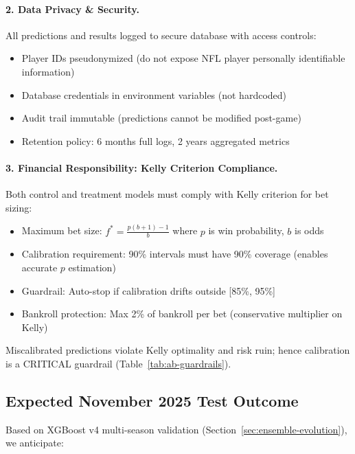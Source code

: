 \paragraph{2. Data Privacy \& Security.}
All predictions and results logged to secure database with access controls:
\begin{itemize}[itemsep=2pt,parsep=0pt]
    \item Player IDs pseudonymized (do not expose NFL player personally identifiable information)
    \item Database credentials in environment variables (not hardcoded)
    \item Audit trail immutable (predictions cannot be modified post-game)
    \item Retention policy: 6 months full logs, 2 years aggregated metrics
\end{itemize}

\paragraph{3. Financial Responsibility: Kelly Criterion Compliance.}
Both control and treatment models must comply with Kelly criterion for bet sizing:
\begin{itemize}[itemsep=2pt,parsep=0pt]
    \item Maximum bet size: $f^* = \frac{p(b+1) - 1}{b}$ where $p$ is win probability, $b$ is odds
    \item Calibration requirement: 90\% intervals must have 90\% coverage (enables accurate $p$ estimation)
    \item Guardrail: Auto-stop if calibration drifts outside [85\%, 95\%]
    \item Bankroll protection: Max 2\% of bankroll per bet (conservative multiplier on Kelly)
\end{itemize}

Miscalibrated predictions violate Kelly optimality and risk ruin; hence calibration is a CRITICAL guardrail (Table~\ref{tab:ab-guardrails}).

\subsection{Expected November 2025 Test Outcome}

Based on XGBoost v4 multi-season validation (Section~\ref{sec:ensemble-evolution}), we anticipate:


